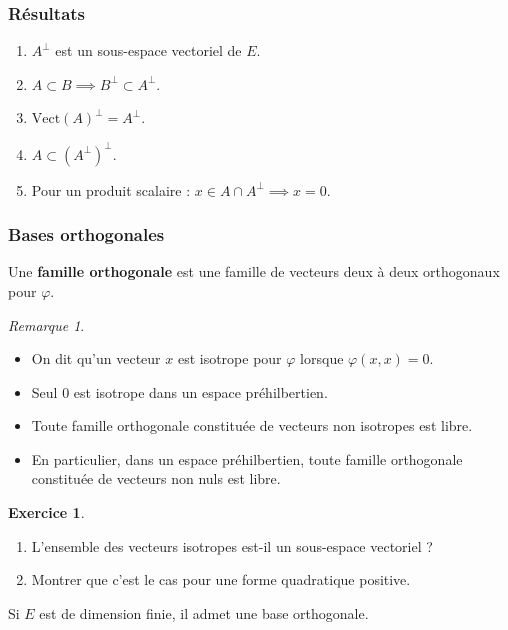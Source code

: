 \documentclass[french]{article}
\theoremstyle{plain}
\theoremstyle{definition}
\newtheorem{exo}{Exercice}
\theoremstyle{remark}
\newtheorem*{rmq}{Remarque}
\begin{document}
\subsubsection*{Résultats}

\begin{enumerate}
	\item $A^\bot$ est un sous-espace vectoriel de $E$.
	\item $A\subset B\implies B^\bot\subset A^\bot$.
	\item $\text{Vect}(A)^\bot=A^\bot$.
	\item $A\subset (A^\bot)^\bot$.
	\item Pour un produit scalaire : $x\in A\cap A^\bot\implies x=0$.
\end{enumerate}

\subsubsection*{Bases orthogonales}

\begin{dfn}
	Une \textbf{famille orthogonale} est une famille de vecteurs deux à deux orthogonaux pour $\varphi$.
\end{dfn}

\begin{rmq}
	\begin{itemize}
		\item On dit qu'un vecteur $x$ est isotrope pour $\varphi$ lorsque $\varphi(x,x)=0$.
		\item Seul $0$ est isotrope dans un espace préhilbertien.
		\item Toute famille orthogonale constituée de vecteurs non isotropes est libre.
		\item En particulier, dans un espace préhilbertien, toute famille orthogonale constituée de vecteurs non nuls est libre.
	\end{itemize}
\end{rmq}

\begin{exo}
	\begin{enumerate}
		\item L'ensemble des vecteurs isotropes est-il un sous-espace vectoriel ?
		\item Montrer que c'est le cas pour une forme quadratique positive.
	\end{enumerate}
\end{exo}

\begin{thm}{}
	Si $E$ est de dimension finie, il admet une base orthogonale.
\end{thm}
\end{document}
